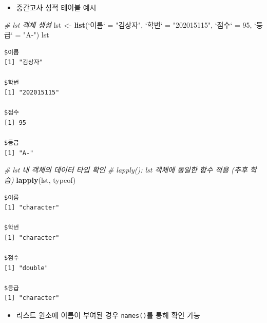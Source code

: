 \documentclass[
  11pt,
]{krantz}
\newenvironment{Shaded}{\begin{snugshade}}{\end{snugshade}}
\newcommand{\CommentTok}[1]{\textcolor[rgb]{0.37,0.37,0.37}{\textit{#1}}}
\newcommand{\DataTypeTok}[1]{\textcolor[rgb]{0.27,0.27,0.27}{#1}}
\newcommand{\DecValTok}[1]{\textcolor[rgb]{0.06,0.06,0.06}{#1}}
\newcommand{\KeywordTok}[1]{\textcolor[rgb]{0.27,0.27,0.27}{\textbf{#1}}}
\newcommand{\NormalTok}[1]{#1}
\newcommand{\StringTok}[1]{\textcolor[rgb]{0.5,0.5,0.5}{#1}}
\providecommand{\tightlist}{%
  \setlength{\itemsep}{0pt}\setlength{\parskip}{0pt}}
\begin{document}
\normalsize

\begin{itemize}
\tightlist
\item
  중간고사 성적 테이블 예시
\end{itemize}

\footnotesize

\begin{Shaded}
\begin{Highlighting}[]
\CommentTok{# lst 객체 생성}
\NormalTok{lst <-}\StringTok{ }\KeywordTok{list}\NormalTok{(}\StringTok{`}\DataTypeTok{이름}\StringTok{`}\NormalTok{ =}\StringTok{ "김상자"}\NormalTok{, }
            \StringTok{`}\DataTypeTok{학번}\StringTok{`}\NormalTok{ =}\StringTok{ "202015115"}\NormalTok{, }
            \StringTok{`}\DataTypeTok{점수}\StringTok{`}\NormalTok{ =}\StringTok{ }\DecValTok{95}\NormalTok{, }
            \StringTok{`}\DataTypeTok{등급}\StringTok{`}\NormalTok{ =}\StringTok{ "A-"}\NormalTok{)}
\NormalTok{lst}
\end{Highlighting}
\end{Shaded}

\begin{verbatim}
$이름
[1] "김상자"

$학번
[1] "202015115"

$점수
[1] 95

$등급
[1] "A-"
\end{verbatim}

\begin{Shaded}
\begin{Highlighting}[]
\CommentTok{# lst 내 객체의 데이터 타입 확인}
\CommentTok{# lapply(): lst 객체에 동일한 함수 적용 (추후 학습)}
\KeywordTok{lapply}\NormalTok{(lst, typeof)}
\end{Highlighting}
\end{Shaded}

\begin{verbatim}
$이름
[1] "character"

$학번
[1] "character"

$점수
[1] "double"

$등급
[1] "character"
\end{verbatim}

\normalsize

\begin{itemize}
\tightlist
\item
  리스트 원소에 이름이 부여된 경우 \texttt{names()}를 통해 확인 가능
\end{itemize}
\end{document}
